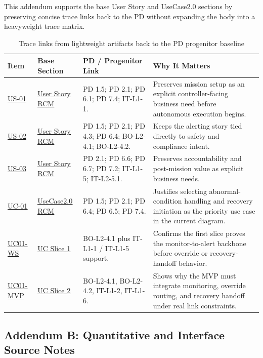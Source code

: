 \documentclass[10pt,a4paper]{article}
\let\orighyperref\hyperref
\renewcommand{\hyperref}[2][]{\orighyperref[#1]{\uline{#2}}}
\let\orighyperlink\hyperlink
\renewcommand{\hyperlink}[2]{\orighyperlink{#1}{\uline{#2}}}
\begin{document}
This addendum supports the base User Story and UseCase2.0 sections by preserving concise trace links back to the PD without expanding the body into a heavyweight trace matrix.

\begin{table}[H]
\centering
\small
\renewcommand{\arraystretch}{1.18}
\begin{tabularx}{\textwidth}{|P{0.16\textwidth}|P{0.2\textwidth}|Y|P{0.18\textwidth}|}
\hline
{}
\textbf{Item} & \textbf{Base Section} & \textbf{PD / Progenitor Link} & \textbf{Why It Matters} \\
\hline
\hyperlink{us01}{US-01} & \hyperref[sec:user-story-rcm]{User Story RCM} & PD 1.5; PD 2.1; PD 6.1; PD 7.4; IT-L1-1. & Preserves mission setup as an explicit controller-facing business need before autonomous execution begins. \\
\hline
\hyperlink{us02}{US-02} & \hyperref[sec:user-story-rcm]{User Story RCM} & PD 1.5; PD 2.1; PD 4.3; PD 6.4; BO-L2-4.1; BO-L2-4.2. & Keeps the alerting story tied directly to safety and compliance intent. \\
\hline
\hyperlink{us03}{US-03} & \hyperref[sec:user-story-rcm]{User Story RCM} & PD 2.1; PD 6.6; PD 6.7; PD 7.2; IT-L1-5; IT-L2-5.1. & Preserves accountability and post-mission value as explicit business needs. \\
\hline
\hyperlink{uc01-priority}{UC-01} & \hyperref[sec:usecase-rcm]{UseCase2.0 RCM} & PD 1.5; PD 2.1; PD 6.4; PD 6.5; PD 7.4. & Justifies selecting abnormal-condition handling and recovery initiation as the priority use case in the current diagram. \\
\hline
\hyperlink{uc01-ws}{UC01-WS} & \hyperref[sec:uc-slice-ws]{UC Slice 1} & BO-L2-4.1 plus IT-L1-1 / IT-L1-5 support. & Confirms the first slice proves the monitor-to-alert backbone before override or recovery-handoff behavior. \\
\hline
\hyperlink{uc01-mvp}{UC01-MVP} & \hyperref[sec:uc-slice-mvp]{UC Slice 2} & BO-L2-4.1, BO-L2-4.2, IT-L1-2, IT-L1-6. & Shows why the MVP must integrate monitoring, override routing, and recovery handoff under real link constraints. \\
\hline
\end{tabularx}
\caption{Trace links from lightweight artifacts back to the PD progenitor baseline}
\label{tab:add-trace}
\end{table}

\subsection{Addendum B: Quantitative and Interface Source Notes}
\label{add:source-notes}
\end{document}

